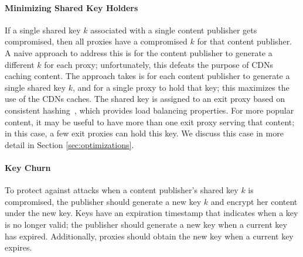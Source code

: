 \paragraph{Minimizing Shared Key Holders} If a single shared key $k$ associated with a single content publisher gets 
compromised, then all proxies have a compromised $k$ for that content publisher.  A naive approach to address this 
is for the content publisher to generate a different $k$ for each proxy; unfortunately, this defeats the purpose of 
CDNs caching content.  The approach \system{} takes is for each content publisher to generate a single shared key $k$, 
and for a single proxy to hold that key; this maximizes the use of the CDNs caches.  The shared key is assigned 
to an exit proxy based on consistent hashing~\cite{karger1997consistent,lewin1998consistent}, which provides load balancing properties.  For more popular 
content, it may be useful to have more than one exit proxy serving that content; in this case, a few exit proxies can 
hold this key.  We discuss this case in more detail in Section \ref{sec:optimizations}.

\paragraph{Key Churn} To protect against attacks when a content publisher's shared key $k$ is compromised, the publisher
should generate a new key $k$ and encrypt her content under the new key.  Keys have an expiration timestamp that indicates 
when a key is no longer valid; the publisher should generate a new key when a current key has expired.  Additionally, 
proxies should obtain the new key when a current key expires.  


